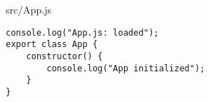 \begin{listtitle}
src/App.js
\end{listtitle}
\begin{lstlisting}
console.log("App.js: loaded");
export class App {
    constructor() {
        console.log("App initialized");
    }
}
\end{lstlisting}
\listend
